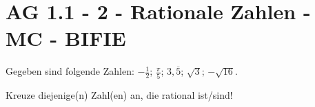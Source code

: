 \section{AG 1.1 - 2 - Rationale Zahlen - MC - BIFIE}

\begin{beispiel}[AG 1.1]{1} %
Gegeben sind folgende Zahlen: $-\frac{1}{2}$; $\frac{\pi}{5}$; $3,\overline{5}$; $\sqrt{3}$; $-\sqrt{16}$.

Kreuze diejenige(n) Zahl(en) an, die rational ist/sind!
\end{beispiel}